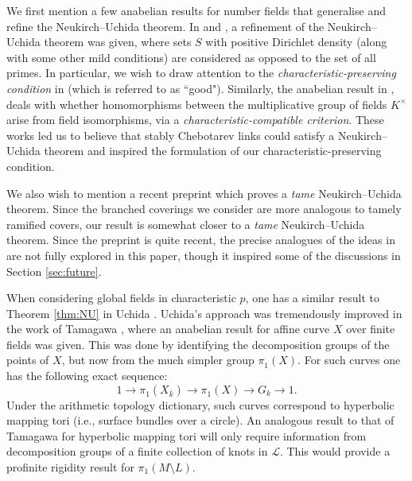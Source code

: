 \documentclass{amsart}
\theoremstyle{plain}
\theoremstyle{definition}
\theoremstyle{plain}
\theoremstyle{plain}
\theoremstyle{plain}
\theoremstyle{remark}
\theoremstyle{remark}
\theoremstyle{plain}
\theoremstyle{definition}
\theoremstyle{plain}
\DeclareMathOperator{\et}{\acute et}
\theoremstyle{plain}
\theoremstyle{plain}
\numberwithin{equation}{section}
\begin{document}
\medskip

We first mention a few anabelian results for number fields that generalise and refine the Neukirch--Uchida theorem. In \cite{ivanov} and \cite{shimizu}, a refinement of the Neukirch--Uchida theorem was given, where sets $S$ with positive Dirichlet density (along with some other mild conditions) are considered as opposed to the set of all primes. In particular, we wish to draw attention to the \emph{characteristic-preserving condition} in \cite{shimizu} (which is referred to as ``good"). Similarly, the anabelian result in \cite{hoshi}, deals with whether homomorphisms between the multiplicative group of fields $K^\times$ arise from field isomorphisms, via a \emph{characteristic-compatible criterion}. These works led us to believe that stably Chebotarev links could satisfy a Neukirch--Uchida theorem and inspired the formulation of our characteristic-preserving condition.

\medskip

We also wish to mention a recent preprint \cite{karshon2026pro} which proves a \emph{tame} Neukirch--Uchida theorem. Since the branched coverings we consider are more analogous to tamely ramified covers, our result is somewhat closer to a \emph{tame} Neukirch--Uchida theorem. Since the preprint is quite recent, the precise analogues of the ideas in \cite{karshon2026pro} are not fully explored in this paper, though it inspired some of the discussions in Section \ref{sec:future}.

\medskip

When considering global fields in characteristic $p$, one has a similar result to Theorem \ref{thm:NU} in Uchida \cite{uchida1977isomorphisms}. Uchida's approach was tremendously improved in the work of Tamagawa \cite{tamagawa}, where an anabelian result for affine curve $X$ over finite fields was given. This was done by identifying the decomposition groups of the points of $X$, but now from the much simpler group $\pi_1^{\et}(X)$. For such curves one has the following exact sequence:
\[1 \to \pi_1^{\et}(X_{\overline{k}})\to \pi_1^{\et}(X) \to G_k \to 1.\]
Under the arithmetic topology dictionary, such curves correspond to hyperbolic mapping tori (i.e., surface bundles over a circle). An analogous result to that of Tamagawa for hyperbolic mapping tori will only require information from decomposition groups of a finite collection of knots in $\mathcal{L}$. This would provide a profinite rigidity result for $\pi_1(M\setminus L)$.

\medskip
\end{document}
